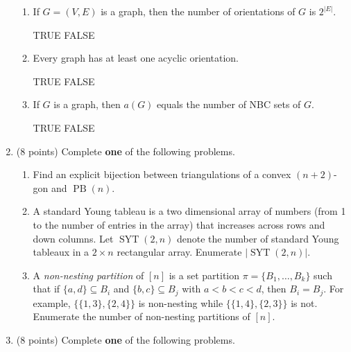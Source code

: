 \documentclass[11pt]{article}
\theoremstyle{definition}
\DeclareMathOperator{\SYT}{SYT}
\DeclareMathOperator{\PB}{PB}
\begin{document}
\begin{enumerate}
\begin{enumerate}
\item If $G=(V,E)$ is a graph, then the number of orientations of $G$ is $2^{|E|}$.

\smallskip

TRUE \qquad FALSE

\item Every graph has at least one acyclic orientation.

\smallskip

TRUE \qquad FALSE

\item If $G$ is a graph, then $a(G)$ equals the number of NBC sets of $G$.

\smallskip

TRUE \qquad FALSE

\end{enumerate}

\item (8 points) Complete \textbf{one} of the following problems.

\begin{enumerate}

\item Find an explicit bijection between triangulations of a convex $(n+2)$-gon and $\PB(n)$.


\item A standard Young tableau is a two dimensional array of numbers (from 1 to the number of entries in the array) that increases across rows and down columns. Let $\SYT(2, n)$ denote the number of standard Young tableaux in a $2\times n$ rectangular array. Enumerate $|\SYT(2,n)|$.

\item A \emph{non-nesting partition} of $[n]$ is a set partition $\pi=\{B_1,\ldots,B_k\}$ such that if $\{a,d\}\subseteq B_i$ and $\{b,c\}\subseteq B_j$ with $a<b<c<d$, then $B_i=B_j$.  For example, $\{\{1,3\},\{2,4\}\}$ is non-nesting while $\{\{1,4\},\{2,3\}\}$ is not.  Enumerate the number of non-nesting partitions of $[n]$.

\end{enumerate}

\item (8 points) Complete \textbf{one} of the following problems.


\end{enumerate}
\end{document}
